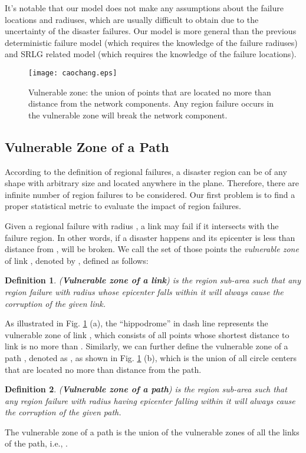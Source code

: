 \documentclass[10pt,journal]{IEEEtran}
\newtheorem{definition}{Definition}
\begin{document}
It's notable that our model does not make any assumptions about the failure locations and radiuses, which are usually difficult to obtain due to the uncertainty of the disaster failures. Our model is more general than the previous deterministic failure model \cite{S09rbc, N08ati} (which requires the knowledge of the failure radiuses) and SRLG related model \cite{SRLG,H03dri, D04drf, S05srl, W10oao, L10dri} (which requires the knowledge of the failure locations).

\begin{figure}
	\centering
		\texttt{[image: caochang.eps]}
	\caption{Vulnerable zone: the union of points that are located no more than  distance from the network components. Any region failure occurs in the vulnerable zone will break the network component.}
	\label{fig:caochang}
\end{figure}
\subsection{Vulnerable Zone of a Path}
According to the definition of regional failures, a disaster region can be of any shape with arbitrary size and located anywhere in the plane. Therefore, there are infinite number of region failures to be considered. Our first problem is to find a proper statistical metric to evaluate the impact of region failures.

Given a regional failure with radius , a link  may fail if it intersects with the failure region. In other words, if a disaster happens and its epicenter is less than  distance from ,  will be broken. We call the set of those points the \emph{vulnerable zone} of link , denoted by \textbf{}, defined as follows:
\begin{definition} (\textbf{Vulnerable zone of a link}) is the region sub-area such that any region failure with radius   whose epicenter falls within it will always cause the corruption of the given link.
\end{definition}
As illustrated in Fig. \ref{fig:caochang} (a), the ``hippodrome'' in dash line represents the vulnerable zone of link , which consists of all points whose shortest distance to link  is no more than .
Similarly, we can further define the vulnerable zone of a path , denoted as  , as shown in Fig. \ref{fig:caochang} (b), which is the union of all circle centers that are located no more than  distance from the path.
\begin{definition} (\textbf{Vulnerable zone of a path}) is the region sub-area such that any region failure with radius  having epicenter falling within it will always cause the corruption of the given path.
\end{definition}
The vulnerable zone of a path  is the union of the vulnerable zones of all the links of the path, i.e., .
\end{document}
